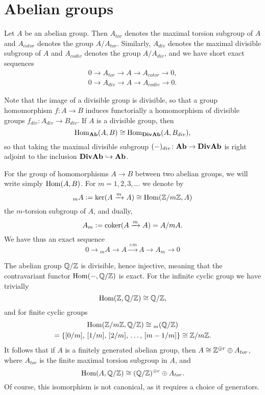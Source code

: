 
\section{Abelian groups}
\label{section:preliminaries-on-abelian-groups}

Let $A$ be an abelian group. Then $A_{tor}$ denotes the maximal torsion subgroup
of $A$ and $A_{cotor}$ denotes the group $A/A_{tor}$. Similarly, $A_{div}$
denotes the maximal divisible subgroup of $A$ and $A_{codiv}$ denotes the group
$A/A_{div}$, and we have short exact sequences
\begin{gather*}
  0 \to A_{tor} \to A \to A_{cotor} \to 0, \\
  0 \to A_{div} \to A \to A_{codiv} \to 0.
\end{gather*}

Note that the image of a divisible group is divisible, so that a group
homomorphism $f\colon A\to B$ induces functorially a homomorphism of divisible
groups $f_{div}\colon A_{div}\to B_{div}$. If $A$ is a divisible group, then
$$\operatorname{Hom}_{\text{\bf Ab}} (A,B) \cong \operatorname{Hom}_{\text{\bf DivAb}} (A,B_{div}),$$
so that taking the maximal divisible subgroup
$(-)_{div}\colon \text{\bf Ab} \to \text{\bf DivAb}$ is right adjoint to the inclusion
$\text{\bf DivAb} \hookrightarrow \text{\bf Ab}$.

For the group of homomorphisms $A\to B$ between two abelian groups, we will
write simply $\operatorname{Hom} (A,B)$. For $m = 1,2,3,\ldots$ we denote by
$${}_m A \mathrel{\mathop:}= \ker (A \xrightarrow{m} A) \cong \operatorname{Hom} (\mathbb{Z}/m\mathbb{Z}, A)$$
the $m$-torsion subgroup of $A$, and dually,
$$A_m \mathrel{\mathop:}= \operatorname{coker} (A \xrightarrow{m} A) = A/m A.$$
We have thus an exact sequence
$$0 \to {}_m A \to A \xrightarrow{\times m} A \to A_m \to 0$$

The abelian group $\mathbb{Q}/\mathbb{Z}$ is divisible, hence injective, meaning that the
contravariant functor $\operatorname{Hom} (-, \mathbb{Q}/\mathbb{Z})$ is exact. For the infinite cyclic
group we have trivially
$$\operatorname{Hom} (\mathbb{Z}, \mathbb{Q}/\mathbb{Z}) \cong \mathbb{Q}/\mathbb{Z},$$
and for finite cyclic groups
\begin{multline*}
  \operatorname{Hom} (\mathbb{Z}/m\mathbb{Z}, \mathbb{Q}/\mathbb{Z}) \cong {}_m (\mathbb{Q}/\mathbb{Z}) \\
  = \{ [0/m], \, [1/m], \, [2/m], \, \ldots, \, [m-1/m] \} \cong \mathbb{Z}/m\mathbb{Z}.
\end{multline*}
It follows that if $A$ is a finitely generated abelian group, then
$A \cong \mathbb{Z}^{\oplus r} \oplus A_{tor}$, where $A_{tor}$ is the finite maximal
torsion subgroup in $A$, and
$$\operatorname{Hom} (A,\mathbb{Q}/\mathbb{Z}) \cong (\mathbb{Q}/\mathbb{Z})^{\oplus r} \oplus A_{tor}.$$
Of course, this isomorphism is not canonical, as it requires a choice of
generators.

